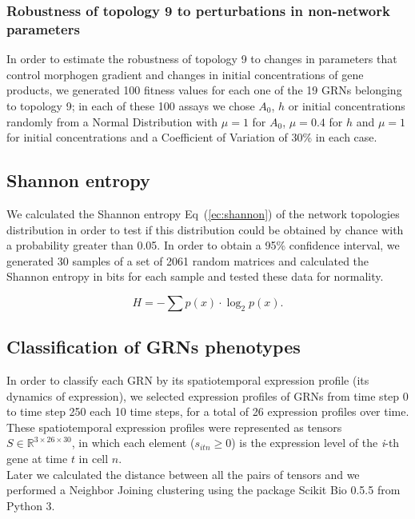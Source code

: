 \documentclass[10pt,letterpaper]{article}
\begin{document}
\subsubsection*{Robustness of topology 9 to perturbations in non-network parameters}

In order to estimate the robustness of topology 9 to changes in parameters that 
control morphogen gradient and changes in initial concentrations of gene 
products, we generated 100 fitness values for each one of the 19 GRNs 
belonging to topology 9; in each of these 100 assays we chose $A_0$, $h$ or 
initial concentrations randomly from a Normal Distribution with $\mu = 1$ for 
$A_0$, $\mu = 0.4$ for $h$ and $\mu = 1$ for initial concentrations and a 
Coefficient of Variation of 30\% in each case.

\subsection*{Shannon entropy}

We calculated the Shannon entropy Eq~(\ref{ec:shannon}) of the network 
topologies distribution in order to test if this distribution could be obtained 
by chance with a probability greater than 0.05. In order to obtain a 95\% 
confidence interval, we generated 30 samples of a set of 2061 random matrices 
and calculated the Shannon entropy in bits for each sample and tested these data
for normality.

\begin{equation}
 H = -\sum p(x) \cdot \log_{2}p(x).
 \label{ec:shannon}
\end{equation}

\subsection*{Classification of GRNs phenotypes}

In order to classify each GRN by its spatiotemporal expression profile (its 
dynamics of expression), we selected expression profiles of GRNs from time step 
0 to time step 250 each 10 time steps, for a total of 26 expression profiles 
over time. These spatiotemporal expression profiles were represented as tensors 
$S \in \mathbb{R}^{3 \times 26 \times 30}$, in which each element ($s_{itn} \geq
0$) is the expression level of the \emph{i}-th gene at time $t$ in cell $n$.\\

Later we calculated the distance between all the pairs of tensors and we 
performed a Neighbor Joining clustering using the package Scikit Bio 0.5.5 from 
Python 3.
\end{document}
